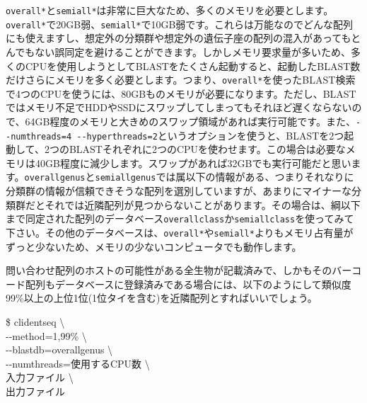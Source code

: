 \documentclass[titlepage,10pt,a4paper,english]{jsbook}
\newenvironment{cmd}{\begin{oframed}\raggedright\ttfamily\footnotesize\setlength{\baselineskip}{1.4em}}{\end{oframed}\vspace{-1em}}
\begin{document}
\texttt{overall{\textunderscore}*}と\texttt{semiall{\textunderscore}*}は非常に巨大なため、多くのメモリを必要とします。\texttt{overall{\textunderscore}*}で20GB弱、\texttt{semiall{\textunderscore}*}で10GB弱です。これらは万能なのでどんな配列にも使えますし、想定外の分類群や想定外の遺伝子座の配列の混入があってもとんでもない誤同定を避けることができます。しかしメモリ要求量が多いため、多くのCPUを使用しようとしてBLASTをたくさん起動すると、起動したBLAST数だけさらにメモリを多く必要とします。つまり、\texttt{overall{\textunderscore}*}を使ったBLAST検索で4つのCPUを使うには、80GBものメモリが必要になります。ただし、BLASTではメモリ不足でHDDやSSDにスワップしてしまってもそれほど遅くならないので、64GB程度のメモリと大きめのスワップ領域があれば実行可能です。また、\texttt{{-}{-}numthreads=4 {-}{-}hyperthreads=2}というオプションを使うと、BLASTを2つ起動して、2つのBLASTそれぞれに2つのCPUを使わせます。この場合は必要なメモリは40GB程度に減少します。スワップがあれば32GBでも実行可能だと思います。\texttt{overall{\textunderscore}genus}と\texttt{semiall{\textunderscore}genus}では属以下の情報がある、つまりそれなりに分類群の情報が信頼できそうな配列を選別していますが、あまりにマイナーな分類群だとそれでは近隣配列が見つからないことがあります。その場合は、綱以下まで同定された配列のデータベース\texttt{overall{\textunderscore}class}か\texttt{semiall{\textunderscore}class}を使ってみて下さい。その他のデータベースは、\texttt{overall{\textunderscore}*}や\texttt{semiall{\textunderscore}*}よりもメモリ占有量がずっと少ないため、メモリの少ないコンピュータでも動作します。

問い合わせ配列のホストの可能性がある全生物が記載済みで、しかもそのバーコード配列もデータベースに登録済みである場合には、以下のようにして類似度99\%以上の上位1位(1位タイを含む)を近隣配列とすればいいでしょう。
\begin{cmd}
\$ clidentseq {\textbackslash}\\
{-}{-}method=1,99\% {\textbackslash}\\
{-}{-}blastdb=overall{\textunderscore}genus {\textbackslash}\\
{-}{-}numthreads=使用するCPU数 {\textbackslash}\\
入力ファイル {\textbackslash}\\
出力ファイル
\end{cmd}
\end{document}
